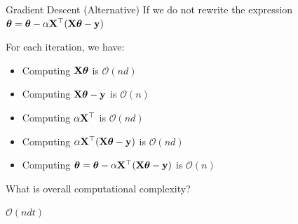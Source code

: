 \documentclass[usenames,dvipsnames]{beamer}
\begin{document}
\begin{frame}{Gradient Descent (Alternative)}
\pause If we do not rewrite the expression
\(\boldsymbol{\theta}=\boldsymbol{\theta} - \alpha \mathbf{X}^{\top}(\mathbf{X} \boldsymbol{\theta}-\mathbf{y})\) 

For each iteration, we have:
\begin{itemize}[<+->]
	\item Computing $\mathbf{X}\boldsymbol{\theta}$ is $\mathcal{O}(nd)$
	\item Computing $\mathbf{X}\boldsymbol{\theta} - \mathbf{y}$ is $\mathcal{O}(n)$
	\item Computing $\alpha \mathbf{X}^{\top}$ is $\mathcal{O}(nd)$
	\item Computing $\alpha \mathbf{X}^{\top}(\mathbf{X}\boldsymbol{\theta} - \mathbf{y})$ is $\mathcal{O}(nd)$
	\item Computing \(\boldsymbol{\theta}=\boldsymbol{\theta} - \alpha \mathbf{X}^{\top}(\mathbf{X} \boldsymbol{\theta}-\mathbf{y})\) is $\mathcal{O}(n)$
\end{itemize}

\pause What is overall computational complexity?

\pause $\mathcal{O}(ndt)$
\end{frame}

 
\end{document}
